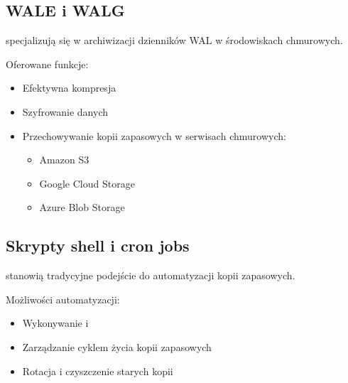 \documentclass[a4paper,11pt,polish]{sphinxmanual}
\begin{document}
\subsection{WAL\sphinxhyphen{}E i WAL\sphinxhyphen{}G}
\label{\detokenize{Kopie_zapasowe_i_odzyskiwanie_danych/kopie_zapasowe_i_odzyskiwanie_danych:wal-e-i-wal-g}}
\sphinxAtStartPar
{} specjalizują się w archiwizacji dzienników WAL w środowiskach chmurowych.

\sphinxAtStartPar
Oferowane funkcje:
\begin{itemize}
\item {} 
\sphinxAtStartPar
Efektywna kompresja

\item {} 
\sphinxAtStartPar
Szyfrowanie danych

\item {} 
\sphinxAtStartPar
Przechowywanie kopii zapasowych w serwisach chmurowych:
\begin{itemize}
\item {} 
\sphinxAtStartPar
Amazon S3

\item {} 
\sphinxAtStartPar
Google Cloud Storage

\item {} 
\sphinxAtStartPar
Azure Blob Storage

\end{itemize}

\end{itemize}


\subsection{Skrypty shell i cron jobs}
\label{\detokenize{Kopie_zapasowe_i_odzyskiwanie_danych/kopie_zapasowe_i_odzyskiwanie_danych:skrypty-shell-i-cron-jobs}}
\sphinxAtStartPar
{} stanowią tradycyjne podejście do automatyzacji kopii zapasowych.

\sphinxAtStartPar
Możliwości automatyzacji:
\begin{itemize}
\item {} 
\sphinxAtStartPar
Wykonywanie  i 

\item {} 
\sphinxAtStartPar
Zarządzanie cyklem życia kopii zapasowych

\item {} 
\sphinxAtStartPar
Rotacja i czyszczenie starych kopii

\end{itemize}
\end{document}
